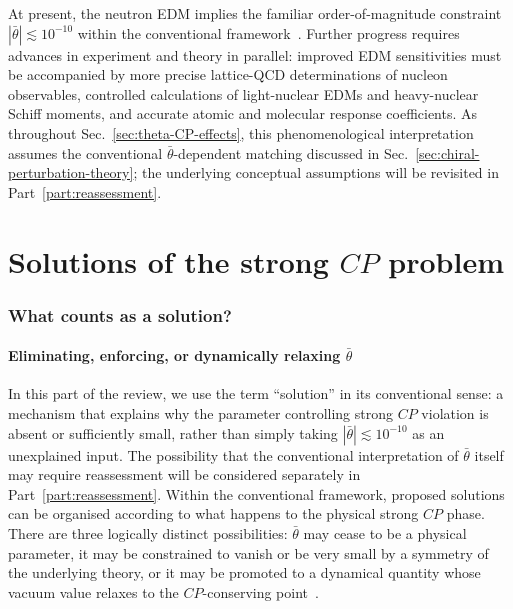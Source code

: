 \documentclass[review]{elsarticle}
\numberwithin{equation}{section}
\numberwithin{table}{section}
\numberwithin{figure}{section}
\begin{document}
At present, the neutron EDM implies the familiar order-of-magnitude constraint $|\bar\theta|\lesssim10^{-10}$ within the conventional framework~\cite{Abel:2020pzs}. Further progress requires advances in experiment and theory in parallel: improved EDM sensitivities must be accompanied by more precise lattice-QCD determinations of nucleon observables, controlled calculations of light-nuclear EDMs and heavy-nuclear Schiff moments, and accurate atomic and molecular response coefficients. As throughout Sec.~\ref{sec:theta-CP-effects}, this phenomenological interpretation assumes the conventional $\bar\theta$-dependent matching discussed in Sec.~\ref{sec:chiral-perturbation-theory}; the underlying conceptual assumptions will be revisited in Part~\ref{part:reassessment}.

\part{Solutions of the strong \texorpdfstring{$CP$}{CP} problem}
\label{part:solutions}

\section{What counts as a solution?}
\label{sec:what-counts-as-solution}

\subsection{Eliminating, enforcing, or dynamically relaxing \texorpdfstring{$\bar\theta$}{theta-bar}}
\label{sec:mechanisms-strong-CP-solutions}

In this part of the review, we use the term ``solution'' in its conventional sense: a mechanism that explains why the parameter controlling strong $CP$ violation is absent or sufficiently small, rather than simply taking $|\bar\theta|\lesssim10^{-10}$ as an unexplained input. The possibility that the conventional interpretation of $\bar\theta$ itself may require reassessment will be considered separately in Part~\ref{part:reassessment}. Within the conventional framework, proposed solutions can be organised according to what happens to the physical strong $CP$ phase. There are three logically distinct possibilities: $\bar\theta$ may cease to be a physical parameter, it may be constrained to vanish or be very small by a symmetry of the underlying theory, or it may be promoted to a dynamical quantity whose vacuum value relaxes to the $CP$-conserving point~\cite{Cheng:1987gp,Peccei:2006as,Hook:2018dlk}.
\end{document}
